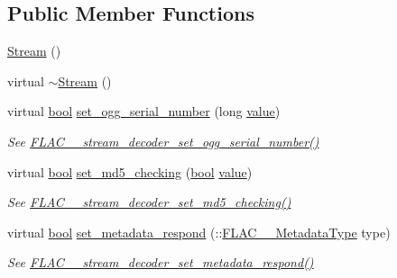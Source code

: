 \subsection*{Public Member Functions}
\begin{DoxyCompactItemize}
\item 
\hyperlink{class_f_l_a_c_1_1_decoder_1_1_stream_aee85c0110292a0631ea7225f2b6afa09}{Stream} ()
\item 
virtual \hyperlink{class_f_l_a_c_1_1_decoder_1_1_stream_ac3085a4ab3a6acaae9ed8cbcd71c8495}{$\sim$\+Stream} ()
\item 
virtual \hyperlink{mac_2config_2i386_2lib-src_2libsoxr_2soxr-config_8h_abb452686968e48b67397da5f97445f5b}{bool} \hyperlink{class_f_l_a_c_1_1_decoder_1_1_stream_af9ff3cbaf7e56e6755c714bd6972c089}{set\+\_\+ogg\+\_\+serial\+\_\+number} (long \hyperlink{lib_2expat_8h_a4a30a13b813682e68c5b689b45c65971}{value})
\begin{DoxyCompactList}\small\item\em See \hyperlink{group__flac__stream__decoder_ga7bb4d567a4a07c911a895b9cef7551d9}{F\+L\+A\+C\+\_\+\+\_\+stream\+\_\+decoder\+\_\+set\+\_\+ogg\+\_\+serial\+\_\+number()} \end{DoxyCompactList}\item 
virtual \hyperlink{mac_2config_2i386_2lib-src_2libsoxr_2soxr-config_8h_abb452686968e48b67397da5f97445f5b}{bool} \hyperlink{class_f_l_a_c_1_1_decoder_1_1_stream_ace8abae9cf554d8f7fd55942ee7ecd2c}{set\+\_\+md5\+\_\+checking} (\hyperlink{mac_2config_2i386_2lib-src_2libsoxr_2soxr-config_8h_abb452686968e48b67397da5f97445f5b}{bool} \hyperlink{lib_2expat_8h_a4a30a13b813682e68c5b689b45c65971}{value})
\begin{DoxyCompactList}\small\item\em See \hyperlink{group__flac__stream__decoder_ga48074d18a17ea88e8272cc8f865ae6e6}{F\+L\+A\+C\+\_\+\+\_\+stream\+\_\+decoder\+\_\+set\+\_\+md5\+\_\+checking()} \end{DoxyCompactList}\item 
virtual \hyperlink{mac_2config_2i386_2lib-src_2libsoxr_2soxr-config_8h_abb452686968e48b67397da5f97445f5b}{bool} \hyperlink{class_f_l_a_c_1_1_decoder_1_1_stream_ab201da8711a3935421c9a3f72a87cc4e}{set\+\_\+metadata\+\_\+respond} (\+::\hyperlink{group__flac__format_gac71714ba8ddbbd66d26bb78a427fac01}{F\+L\+A\+C\+\_\+\+\_\+\+Metadata\+Type} type)
\begin{DoxyCompactList}\small\item\em See \hyperlink{group__flac__stream__decoder_ga1644555cae7c54215c39bb4971100728}{F\+L\+A\+C\+\_\+\+\_\+stream\+\_\+decoder\+\_\+set\+\_\+metadata\+\_\+respond()} \end{DoxyCompactList}\item 

\end{DoxyCompactItemize}
